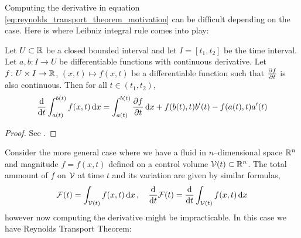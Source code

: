Computing the derivative in equation
\eqref{eq:reynolds_transport_theorem_motivation} can be difficult depending on
the case. Here is where Leibniz integral rule comes into play:

\begin{theorem}
	Let $U \subset \mathbb{R}$ be a closed bounded interval and let $I = [t_1, t_2]$
	be the time interval. Let $a, b \colon I \rightarrow U$ be differentiable
	functions with continuous derivative. Let $f \colon U \times I \rightarrow
	\mathbb{R}$, $(x,t) \mapsto f(x,t)$ be a differentiable function such that
	$\pdv{f}{t}$ is also continuous. Then for all $t \in (t_1, t_2)$,
	\begin{equation} \label{eq:leibniz_rule}
		\frac{\dd}{\dd{t}} \int_{a(t)}^{b(t)} f(x,t) \dd{x} = 
		\int_{a(t)}^{b(t)} \pdv{f}{t}(x,t) \dd{x} + f(b(t),t) b'(t) - f(a(t),t) a'(t)
	\end{equation}
\end{theorem}
\begin{proof}
	See \cite{kaplan2002advanced}.
\end{proof}

\noindent
Consider the more general case where we have a fluid in $n$--dimensional space
$\mathbb{R}^n$ and magnitude $f = f(x,t)$ defined on a control volume ${\mathcal{V}(t)} \subset
\mathbb{R}^n$. The total ammount of $f$ on $\mathcal{V}_{}$ at time $t$ and its variation are given by similar formulas,
\begin{equation}
	\mathcal{F}(t) = \int_{\mathcal{V}(t)} f(x,t) \dd{x}, \quad
	\frac{\dd}{\dd{t}} \mathcal{F}(t) = \frac{\dd}{\dd{t}} \int_{\mathcal{V}(t)} f(x,t) \dd{x}
\end{equation}
however now computing the derivative might be impracticable. In this case we
have Reynolds Transport Theorem:

